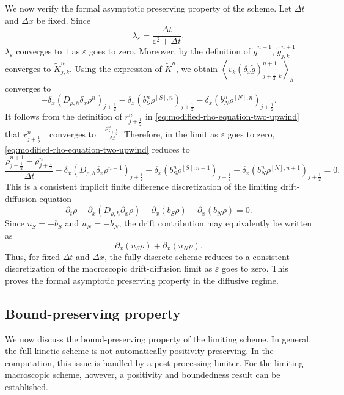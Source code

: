 \documentclass[11pt,twoside]{article}
\theoremstyle{plain}
\theoremstyle{nonumberplain}
\begin{document}
{We now verify the formal asymptotic preserving property of the scheme.
Let \(\Delta t\) and \(\Delta x\) be fixed. Since
\[
\lambda_\varepsilon
=
\frac{\Delta t}{\varepsilon^2+\Delta t},
\]
\(\lambda_\varepsilon\) converges to \(1\) as \(\varepsilon\) goes to zero.
Moreover, by the definition of \(\widetilde g^{n+1}\),
\(\widetilde g_{j,k}^{n+1}\) converges to \(\widetilde K_{j,k}^{n}\).
Using the expression of \(\widetilde K^n\), we obtain \(\left\langle
v_k(\delta_x\widetilde g)_{j+\frac12,k}^{n+1}
\right\rangle_h\) converges to
\[
-\delta_x\left(D_{\rho,h}\delta_x\rho^n\right)_{j+\frac12}
-
\delta_x\left(b_S^n\rho^{[S],n}\right)_{j+\frac12}
-
\delta_x\left(b_N^n\rho^{[N],n}\right)_{j+\frac12}.
\]
It follows from the definition of \(r_{j+\frac12}^n\) in
\eqref{eq:modified-rho-equation-two-upwind} that
\(
r_{j+\frac12}^n
\quad\text{converges to}\quad
\frac{\rho_{j+\frac12}^n}{\Delta t}.
\)
Therefore, in the limit as \(\varepsilon\) goes to zero,
\eqref{eq:modified-rho-equation-two-upwind} reduces to
\begin{equation}\label{eq:limiting-density-scheme}
\frac{\rho_{j+\frac12}^{n+1}-\rho_{j+\frac12}^{n}}{\Delta t}
-
\delta_x\left(
D_{\rho,h}\delta_x\rho^{n+1}
\right)_{j+\frac12}
-
\delta_x\left(
b_S^n\rho^{[S],n+1}
\right)_{j+\frac12}
-
\delta_x\left(
b_N^n\rho^{[N],n+1}
\right)_{j+\frac12}
=0 .
\end{equation}
This is a consistent implicit finite difference discretization of the
limiting drift-diffusion equation
\[
\partial_t\rho
-
\partial_x\left(D_{\rho,h}\partial_x\rho\right)
-
\partial_x\left(b_S\rho\right)
-
\partial_x\left(b_N\rho\right)
=0 .
\]
Since \(u_S=-b_S\) and \(u_N=-b_N\), the drift contribution may equivalently
be written as
\[
\partial_x(u_S\rho)+\partial_x(u_N\rho).
\]
Thus, for fixed \(\Delta t\) and \(\Delta x\), the fully discrete scheme
reduces to a consistent discretization of the macroscopic drift-diffusion
limit as \(\varepsilon\) goes to zero. This proves the formal asymptotic
preserving property in the diffusive regime.

\subsection{Bound-preserving property}

We now discuss the bound-preserving property of the limiting scheme.
In general, the full kinetic scheme is not automatically positivity
preserving. In the computation, this issue is handled by a post-processing
limiter. For the limiting macroscopic scheme, however, a positivity and
boundedness result can be established.

}
\end{document}
